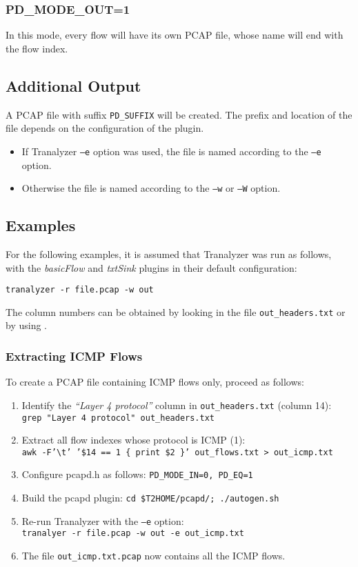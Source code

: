 \documentclass[documentation]{subfiles}
\begin{document}
\subsubsection{PD\_MODE\_OUT=1}\label{pcapdoneperflow}
In this mode, every flow will have its own PCAP file, whose name will end with the flow index.

\subsection{Additional Output}
A PCAP file with suffix {\tt PD\_SUFFIX} will be created.
The prefix and location of the file depends on the configuration of the plugin.
\begin{itemize}
    \item If Tranalyzer {\tt --e} option was used, the file is named according to the {\tt --e} option.
    \item Otherwise the file is named according to the {\tt --w} or {\tt --W} option.
\end{itemize}

\subsection{Examples}
For the following examples, it is assumed that Tranalyzer was run as follows, with the {\em basicFlow} and {\em txtSink} plugins in their default configuration:
\begin{center}
    {\tt tranalyzer -r file.pcap -w out}
\end{center}

The column numbers can be obtained by looking in the file {\tt out\_headers.txt} or by using .

\subsubsection{Extracting ICMP Flows}\label{pdicmp}
To create a PCAP file containing ICMP flows only, proceed as follows:
\begin{enumerate}
    \item Identify the {\em ``Layer 4 protocol''} column in {\tt out\_headers.txt} (column 14):\\
        {\tt grep "Layer 4 protocol" out\_headers.txt}
    \item Extract all flow indexes whose protocol is ICMP (1):\\
        {\tt awk -F'\textbackslash{}t' '\$14 == 1 \{ print \$2 \}' out\_flows.txt > out\_icmp.txt}
    \item Configure pcapd.h as follows: {\tt PD\_MODE\_IN=0, PD\_EQ=1}
    \item Build the pcapd plugin: {\tt cd \$T2HOME/pcapd/; ./autogen.sh}
    \item Re-run Tranalyzer with the {\tt --e} option:\\
        {\tt tranalyer -r file.pcap -w out -e out\_icmp.txt}
    \item The file {\tt out\_icmp.txt.pcap} now contains all the ICMP flows.\\
\end{enumerate}
\end{document}
